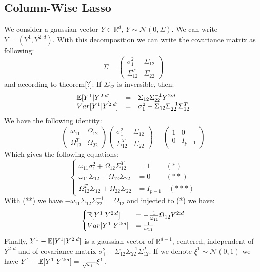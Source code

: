 \documentclass[a4paper,12pt]{article}
\let\bb\mathbb       %
\def\RR{{\bb R}}\def\ZZ{{\bb Z}}\def\FF{{\bb F}}\def\DD{{\bb D}}
\def\bb{\mathbb}
\begin{document}
\subsection{Column-Wise Lasso}

We consider a gaussian vector $Y\in \RR^d$, $Y \sim \mathcal N(0,\Sigma)$. We can write $Y=(Y^1,Y^{2:d})$. With this decomposition we can write the covariance matrix as following:
\begin{equation}
\Sigma=
 \begin{pmatrix}
\sigma_1^2 & \Sigma_{12}\\
\Sigma_{12}^T & \Sigma_{22}
\end{pmatrix}
\end{equation}
and according to theorem[?]: If $\Sigma_{22}$ is inversible, then:
\begin{equation}
\begin{array}{lcl}
\EE[Y^1|Y^{2:d}]&=&\Sigma_{12}\Sigma_{22}^{-1}Y^{2:d}\\
Var[Y^1|Y^{2:d}]&=&\sigma_1^2-\Sigma_{12}\Sigma_{22}^{-1}\Sigma_{12}^T
\end{array}
\end{equation}
We have the following identity:
\begin{equation}
 \begin{pmatrix}
 \omega_{11}&\Omega_{12}\\
 \Omega_{12}^T&\Omega_{22}
\end{pmatrix}
 \begin{pmatrix}
 \sigma_{1}^2&\Sigma_{12}\\
 \Sigma_{12}^T&\Sigma_{22}
\end{pmatrix}
=
 \begin{pmatrix}
 1&0\\
0&I_{p-1}
\end{pmatrix}
\end{equation}
Which gives the following equations:
\begin{equation}
  \begin{cases}
  \omega_{11}\sigma_1^2+\Omega_{12}\Sigma_{12}^T&=1\quad\,\quad(*) \\
  \omega_{11}\Sigma_{12}+\Omega_{12}\Sigma_{22}&=0\quad\,\quad(**)\\
  \Omega_{12}^T\Sigma_{12}+\Omega_{22}\Sigma_{22}&=I_{p-1}\quad(***)
  \end{cases}
\end{equation}
With (**) we have $-\omega_{11}\Sigma_{12}\Sigma_{22}^{-1}=\Omega_{12}$ and injected to (*) we have:
\begin{equation}
 \begin{cases}
 \EE[Y^1|Y^{2:d}]&=-\frac{1}{\omega_{11}}\Omega_{12}Y^{2:d}\\
  Var[Y^1|Y^{2:d}]&=\frac{1}{\omega_{11}}
  \end{cases}
\end{equation}
Finally, $Y^1-\EE[Y^1|Y^{2:d}]$ is a gaussian vector of $\RR^{d-1}$, centered, independent of $Y^{2:d}$ and of covariance matrix $\sigma_1^2-\Sigma_{12}\Sigma_{22}^{-1}\Sigma_{12}^T$. If we denote  $\xi^1\sim \mathcal N(0,1)$ we have $Y^1-\EE[Y^1|Y^{2:d}]=\frac{1}{ \sqrt{\omega_{11}}}\xi^1$.\\
\end{document}
